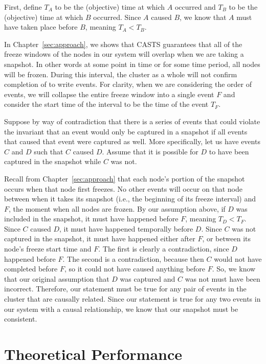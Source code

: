First, define $T_A$ to be the (objective) time at which $A$ occurred
and $T_B$ to be the (objective) time at which $B$ occurred. Since $A$
caused $B$, we know that $A$ must have taken place before $B$, meaning
$T_A < T_B$.

In Chapter~\ref{sec:approach}, we shows that CASTS guarantees that all
of the freeze windows of the nodes in our system will overlap when we
are taking a snapshot. In other words at some point in time or for
some time period, all nodes will be frozen.  During this interval, the
cluster as a whole will not confirm completion of to write events. For
clarity, when we are considering the order of events, we will collapse
the entire freeze window into a single event $F$ and consider the start
time of the interval to be the time of the event $T_F$.

Suppose by way of contradiction that there is a series of
events that could violate the invariant that an event would only be
captured in a snapshot if all events that caused that event were
captured as well. More specifically, let us have events $C$ and $D$
such that $C$ caused $D$. Assume that it is possible for $D$ to have
been captured in the snapshot while $C$ was not.

Recall from Chapter~\ref{sec:approach} that each node's portion of the
snapshot occurs when that node first freezes. No other events will
occur on that node between when it takes its snapshot (i.e., the
beginning of its freeze interval) and $F$, the moment when all nodes
are frozen. By our assumption above, if $D$ was included in the
snapshot, it must have happened before $F$, meaning $T_D <T_F$. Since
$C$ caused $D$, it must have happened temporally before $D$.  Since
$C$ was not captured in the snapshot, it must have happened either
after $F$, or between its node's freeze start time and $F$. The first
is clearly a contradiction, since $D$ happened before $F$. The second
is a contradiction, because then $C$ would not have completed before
$F$, so it could not have caused anything before $F$. So, we know that
our original assumption that $D$ was captured and $C$ was not must
have been incorrect. Therefore, our statement must be true for any
pair of events in the cluster that are causally related. Since our
statement is true for any two events in our system with a causal
relationship, we know that our snapshot must be consistent.

\section{Theoretical Performance}

